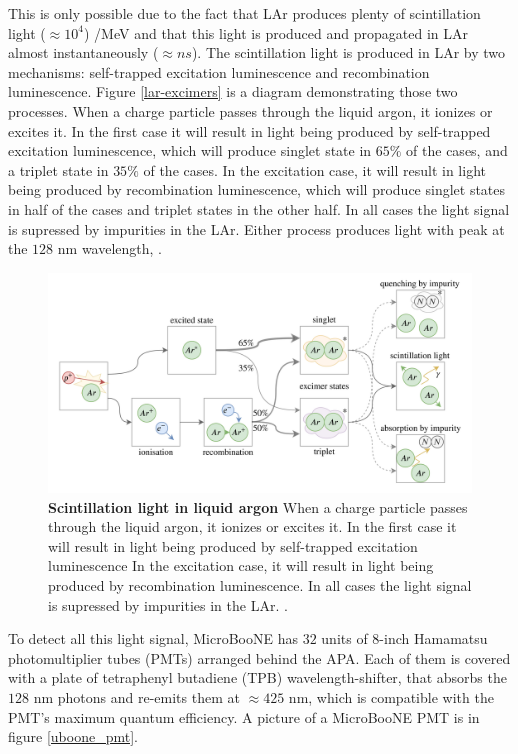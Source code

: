 This is only possible due to the fact that LAr produces plenty of scintillation light ($\approx 10^4 $) /MeV and that this light is produced and propagated in LAr almost instantaneously ($\approx ns$). The scintillation light is produced in LAr by two mechanisms: self-trapped excitation luminescence and recombination luminescence. Figure \ref{lar-excimers} is a diagram demonstrating those two processes. When a charge particle passes through the liquid argon, it ionizes or excites it. In the first case it will result in light being produced by self-trapped excitation luminescence, which will produce singlet state in $65\%$ of the cases, and a triplet state in $35\%$ of the cases. In the excitation case, it will result in light being produced by recombination luminescence, which will produce singlet states in half of the cases and triplet states in the other half. In all cases the light signal is supressed by impurities in the LAr. Either process produces light with peak at the $128$ nm wavelength, \cite{lar_excimers}.

\begin{figure}[h!]
    \begin{center}
        \includegraphics[scale=0.35]{Figures/lar_excimers.png}
        \caption[Scintillation light in liquid argon]{{\textbf{Scintillation light in liquid argon}} When a charge particle passes through the liquid argon, it ionizes or excites it. In the first case it will result in light being produced by self-trapped excitation luminescence In the excitation case, it will result in light being produced by recombination luminescence. In all cases the light signal is supressed by impurities in the LAr. \cite{lar_excimers}.}
        \label{uboone_cryo} 
    \end{center}
\end{figure}

To detect all this light signal, MicroBooNE has $32$ units of 8-inch Hamamatsu photomultiplier tubes (PMTs) arranged behind the APA. Each of them is covered with a plate of tetraphenyl butadiene (TPB) wavelength-shifter, that absorbs the $128$ nm photons and re-emits them at $\approx425$ nm, which is compatible with the PMT's maximum quantum efficiency. A picture of a MicroBooNE PMT is in figure \ref{uboone_pmt}.

